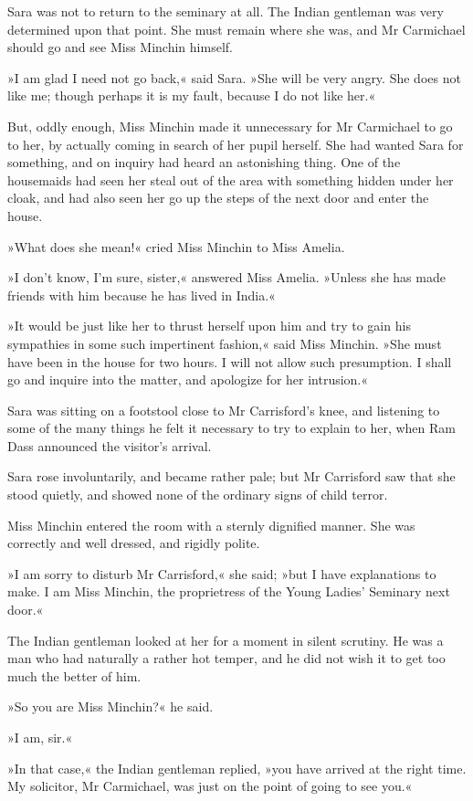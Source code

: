 Sara was not to return to the seminary at all. The Indian gentleman was very determined upon that point. She must remain where she was, and Mr Carmichael should go and see Miss Minchin himself.

»I am glad I need not go back,« said Sara. »She will be very angry. She does not like me; though perhaps it is my fault, because I do not like her.«

But, oddly enough, Miss Minchin made it unnecessary for Mr Carmichael to go to her, by actually coming in search of her pupil herself. She had wanted Sara for something, and on inquiry had heard an astonishing thing. One of the housemaids had seen her steal out of the area with something hidden under her cloak, and had also seen her go up the steps of the next door and enter the house.

»What does she mean!« cried Miss Minchin to Miss Amelia.

»I don't know, I'm sure, sister,« answered Miss Amelia. »Unless she has made friends with him because he has lived in India.«

»It would be just like her to thrust herself upon him and try to gain his sympathies in some such impertinent fashion,« said Miss Minchin. »She must have been in the house for two hours. I will not allow such presumption. I shall go and inquire into the matter, and apologize for her intrusion.«

Sara was sitting on a footstool close to Mr Carrisford's knee, and listening to some of the many things he felt it necessary to try to explain to her, when Ram Dass announced the visitor's arrival.

Sara rose involuntarily, and became rather pale; but Mr Carrisford saw that she stood quietly, and showed none of the ordinary signs of child terror.

Miss Minchin entered the room with a sternly dignified manner. She was correctly and well dressed, and rigidly polite.

»I am sorry to disturb Mr Carrisford,« she said; »but I have explanations to make. I am Miss Minchin, the proprietress of the Young Ladies' Seminary next door.«

The Indian gentleman looked at her for a moment in silent scrutiny. He was a man who had naturally a rather hot temper, and he did not wish it to get too much the better of him.

»So you are Miss Minchin?« he said.

»I am, sir.«

»In that case,« the Indian gentleman replied, »you have arrived at the right time. My solicitor, Mr Carmichael, was just on the point of going to see you.«

